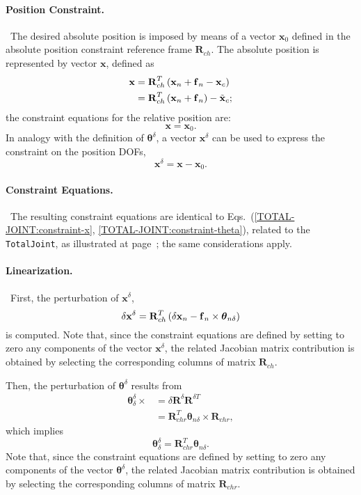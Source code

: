 \documentclass[10pt,dvips,fleqn,subeqn]{report}
\newcommand{\T}[1]{\bm{\mathbf{#1}}}
\newcommand{\dofs}{DOFs}
\begin{document}
\paragraph{Position Constraint.} \
The desired absolute position is imposed by means of a vector $\T{x}_0$
defined in the absolute position constraint reference frame $\T{R}_{ch}$.
The absolute position is represented by vector $\T{x}$, defined as
\begin{align}
	\T{x} &= \T{R}_{ch}^T\plbr{
		\T{x}_n + \T{f}_n - \T{x}_c
	} \nonumber \\
	&= \T{R}_{ch}^T\plbr{
		\T{x}_n + \T{f}_n
	} - \tilde{\T{x}}_c ;
\end{align}
the constraint equations for the relative position are:
\begin{equation}
	\T{x} = \T{x}_0 .
\end{equation}
In analogy with the definition of $\T{\theta}^{\delta}$, a vector
$\T{x}^{\delta}$ can be used to express the constraint
on the position \dofs,
\begin{equation}
	\T{x}^{\delta} = \T{x} - \T{x}_0 .
\end{equation}

\paragraph{Constraint Equations.} \
The resulting constraint equations are identical
to Eqs.~(\ref{TOTAL-JOINT:constraint-x}, \ref{TOTAL-JOINT:constraint-theta}),
related to the \texttt{TotalJoint}, as illustrated
at page~\pageref{TOTAL-JOINT:constraint-x};
the same considerations apply.

\paragraph{Linearization.} \
First, the perturbation of $\T{x}^{\delta}$,
\begin{equation}
	\delta \T{x}^{\delta} = 
	\T{R}_{ch}^T\plbr{
		\delta\T{x}_n - \T{f}_n \times \T{\theta}_{n\delta}
	}
\end{equation}
is computed.
Note that, since the constraint equations are defined by setting 
to zero any components of the vector $\T{x}^{\delta}$, the
related Jacobian matrix contribution is obtained by selecting 
the corresponding columns of matrix $\T{R}_{ch}$.

Then, the perturbation of $\T{\theta}^{\delta}$ results from
\begin{align}
	\T{\theta}^{\delta}_{\delta} \times{}
	&= \delta\T{R}^{\delta} \T{R}^{\delta T} \nonumber \\
	&= \T{R}_{chr}^T \T{\theta}_{n\delta} \times \T{R}_{chr} ,
\end{align}
which implies
\begin{equation}
	\T{\theta}^{\delta}_{\delta} = \T{R}_{chr}^T \T{\theta}_{n\delta} .
\end{equation}
Note that, since the constraint equations are defined by setting 
to zero any components of the vector $\T{\theta}^{\delta}$, the
related Jacobian matrix contribution is obtained by selecting 
the corresponding columns of matrix $\T{R}_{chr}$.
\end{document}
